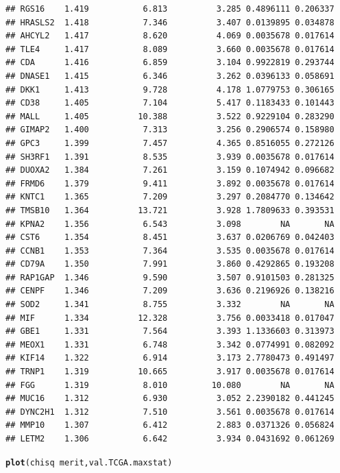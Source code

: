 \documentclass{article}\usepackage[]{graphicx}\usepackage[]{color}
\makeatletter
\newcommand{\hlopt}[1]{\textcolor[rgb]{0,0,0}{#1}}%
\newcommand{\hlstd}[1]{\textcolor[rgb]{0.345,0.345,0.345}{#1}}%
\newcommand{\hlkwd}[1]{\textcolor[rgb]{0.737,0.353,0.396}{\textbf{#1}}}%
\newenvironment{kframe}{%
 \def\at@end@of@kframe{}%
 \ifinner\ifhmode%
  \def\at@end@of@kframe{\end{minipage}}%
  \begin{minipage}{\columnwidth}%
 \fi\fi%
 \def\FrameCommand##1{\hskip\@totalleftmargin \hskip-\fboxsep
 \colorbox{shadecolor}{##1}\hskip-\fboxsep
     \hskip-\linewidth \hskip-\@totalleftmargin \hskip\columnwidth}%
 \MakeFramed {\advance\hsize-\width
   \@totalleftmargin\z@ \linewidth\hsize
   \@setminipage}}%
 {\par\unskip\endMakeFramed%
 \at@end@of@kframe}
\newenvironment{knitrout}{}{} %
\makeatother
\begin{document}
\begin{knitrout}
\begin{kframe}
\begin{verbatim}
## RGS16    1.419           6.813          3.285 0.4896111 0.206337
## HRASLS2  1.418           7.346          3.407 0.0139895 0.034878
## AHCYL2   1.417           8.620          4.069 0.0035678 0.017614
## TLE4     1.417           8.089          3.660 0.0035678 0.017614
## CDA      1.416           6.859          3.104 0.9922819 0.293744
## DNASE1   1.415           6.346          3.262 0.0396133 0.058691
## DKK1     1.413           9.728          4.178 1.0779753 0.306165
## CD38     1.405           7.104          5.417 0.1183433 0.101443
## MALL     1.405          10.388          3.522 0.9229104 0.283290
## GIMAP2   1.400           7.313          3.256 0.2906574 0.158980
## GPC3     1.399           7.457          4.365 0.8516055 0.272126
## SH3RF1   1.391           8.535          3.939 0.0035678 0.017614
## DUOXA2   1.384           7.261          3.159 0.1074942 0.096682
## FRMD6    1.379           9.411          3.892 0.0035678 0.017614
## KNTC1    1.365           7.209          3.297 0.2084770 0.134642
## TMSB10   1.364          13.721          3.928 1.7809633 0.393531
## KPNA2    1.356           6.543          3.098        NA       NA
## CST6     1.354           8.451          3.637 0.0206769 0.042403
## CCNB1    1.353           7.364          3.535 0.0035678 0.017614
## CD79A    1.350           7.991          3.860 0.4292865 0.193208
## RAP1GAP  1.346           9.590          3.507 0.9101503 0.281325
## CENPF    1.346           7.209          3.636 0.2196926 0.138216
## SOD2     1.341           8.755          3.332        NA       NA
## MIF      1.334          12.328          3.756 0.0033418 0.017047
## GBE1     1.331           7.564          3.393 1.1336603 0.313973
## MEOX1    1.331           6.748          3.342 0.0774991 0.082092
## KIF14    1.322           6.914          3.173 2.7780473 0.491497
## TRNP1    1.319          10.665          3.917 0.0035678 0.017614
## FGG      1.319           8.010         10.080        NA       NA
## MUC16    1.312           6.930          3.052 2.2390182 0.441245
## DYNC2H1  1.312           7.510          3.561 0.0035678 0.017614
## MMP10    1.307           6.412          2.883 0.0371326 0.056824
## LETM2    1.306           6.642          3.934 0.0431692 0.061269
\end{verbatim}
\begin{alltt}
\hlkwd{plot}\hlstd{(chisq} \hlopt{~} \hlstd{merit, val.TCGA.maxstat)}
\end{alltt}
\end{kframe}


\end{knitrout}
\end{document}
